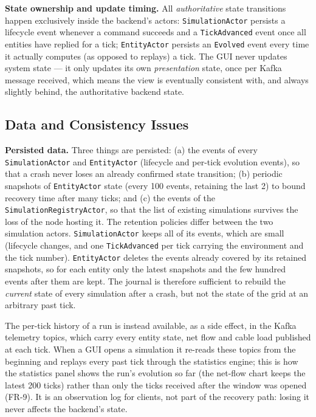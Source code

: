 \documentclass{scrreprt}
\begin{document}
\textbf{State ownership and update timing.} All \emph{authoritative} state transitions
happen exclusively inside the backend's actors: \texttt{SimulationActor} persists a lifecycle
event whenever a command succeeds and a \texttt{TickAdvanced} event once all entities have
replied for a tick; \texttt{EntityActor} persists an \texttt{Evolved} event every time it
actually computes (as opposed to replays) a tick. The GUI never updates system state --- it
only updates its own \emph{presentation} state, once per Kafka message received, which means
the view is eventually consistent with, and always slightly behind, the authoritative backend
state.


\subsection{Data and Consistency Issues}\label{data-and-consistency-issues}

\textbf{Persisted data.} Three things are persisted: (a) the events of every
\texttt{SimulationActor} and \texttt{EntityActor} (lifecycle and per-tick evolution events), so
that a crash never loses an already confirmed state transition; (b) periodic snapshots of
\texttt{EntityActor} state (every 100 events, retaining the last 2) to bound recovery time
after many ticks; and (c) the events of the \texttt{SimulationRegistryActor}, so that the list
of existing simulations survives the loss of the node hosting it. The retention policies differ
between the two simulation actors. \texttt{SimulationActor} keeps all of its events, which are
small (lifecycle changes, and one \texttt{TickAdvanced} per tick carrying the environment and the
tick number). \texttt{EntityActor} deletes the events already covered by its retained
snapshots, so for each entity only the latest snapshots and the few hundred events after them
are kept. The journal is therefore sufficient to rebuild the \emph{current} state of every
simulation after a crash, but not the state of the grid at an arbitrary past tick.

The per-tick history of a run is instead available, as a side effect, in the Kafka telemetry
topics,
which carry every entity state, net flow and cable load published at each tick. When a GUI
opens a simulation it re-reads these topics from the beginning and
replays every past tick through the statistics engine; this is how the statistics panel shows
the run's evolution so far (the net-flow chart keeps the latest 200 ticks) rather than only
the ticks received after the window was opened (\textsc{FR-9}). It is
an observation log for clients, not part of the recovery path: losing it never affects the
backend's state.
\end{document}
